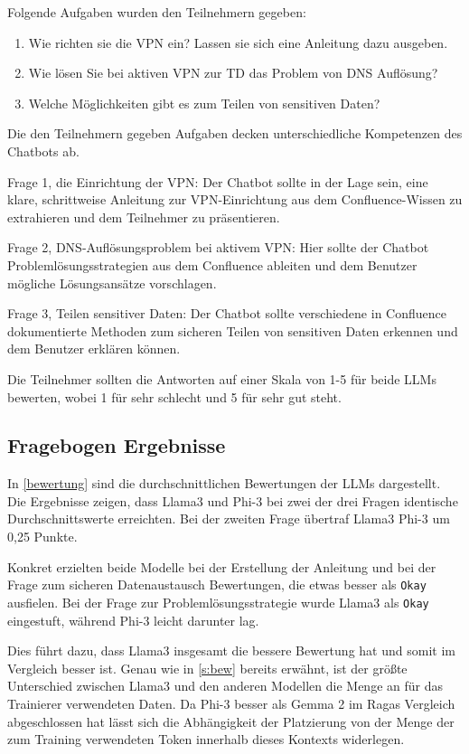Folgende Aufgaben wurden den Teilnehmern gegeben:

\begin{enumerate}
    \item Wie richten sie die VPN ein? Lassen sie sich eine Anleitung dazu ausgeben.
    \item Wie lösen Sie bei aktiven VPN zur TD das Problem von DNS Auflösung?
    \item Welche Möglichkeiten gibt es zum Teilen von sensitiven Daten?
\end{enumerate}
Die den Teilnehmern gegeben Aufgaben decken unterschiedliche 
Kompetenzen des Chatbots ab.\par\par
Frage 1, die Einrichtung der VPN: Der Chatbot sollte in 
der Lage sein, eine klare, schrittweise Anleitung zur 
VPN-Einrichtung aus dem Confluence-Wissen zu extrahieren 
und dem Teilnehmer zu präsentieren.\par
Frage 2, DNS-Auflösungsproblem bei aktivem VPN:
Hier sollte der Chatbot Problemlösungsstrategien aus 
dem Confluence ableiten und dem Benutzer mögliche
 Lösungsansätze vorschlagen.\par
Frage 3, Teilen sensitiver Daten:
Der Chatbot sollte verschiedene in Confluence 
dokumentierte Methoden zum sicheren Teilen von sensitiven Daten 
erkennen und dem Benutzer erklären können.\par\par

Die Teilnehmer sollten die Antworten auf einer Skala von 1-5 für beide 
LLMs bewerten, wobei 1 für sehr schlecht und 5 für sehr gut steht. \par\bigskip

\subsection{Fragebogen Ergebnisse}
In \ref{bewertung} sind die durchschnittlichen Bewertungen der LLMs dargestellt. 
Die Ergebnisse zeigen, dass Llama3 und Phi-3 bei zwei der drei Fragen identische 
Durchschnittswerte erreichten. Bei der zweiten Frage übertraf Llama3 Phi-3 um 0,25 Punkte.

Konkret erzielten beide Modelle bei der Erstellung der Anleitung und bei der
 Frage zum sicheren Datenaustausch Bewertungen, die etwas besser als \verb|Okay|
  ausfielen. Bei der Frage zur Problemlösungsstrategie wurde Llama3 als 
  \verb|Okay| eingestuft, während Phi-3 leicht darunter lag.\par

Dies führt dazu, dass Llama3 insgesamt die bessere Bewertung hat und somit 
im Vergleich besser ist. Genau wie in \ref*{s:bew} bereits erwähnt, ist der 
größte Unterschied zwischen Llama3 und den anderen Modellen die Menge an für 
das Trainierer verwendeten Daten. Da Phi-3 besser als Gemma 2 im Ragas Vergleich 
abgeschlossen hat lässt sich die Abhängigkeit der Platzierung von der Menge der 
zum Training verwendeten Token innerhalb dieses Kontexts widerlegen.
